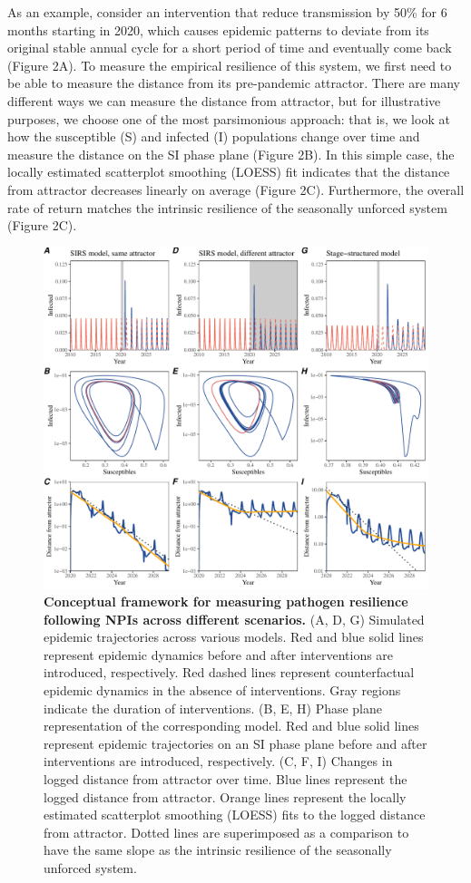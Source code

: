 \documentclass[12pt]{article}
\begin{document}
As an example, consider an intervention that reduce transmission by 50\% for 6 months starting in 2020, which causes epidemic patterns to deviate from its original stable annual cycle for a short period of time and eventually come back (Figure 2A).
To measure the empirical resilience of this system, we first need to be able to measure the distance from its pre-pandemic attractor.
There are many different ways we can measure the distance from attractor, but for illustrative purposes, we choose one of the most parsimonious approach: that is, we look at how the susceptible (S) and infected (I) populations change over time and measure the distance on the SI phase plane (Figure 2B).
In this simple case, the locally estimated scatterplot smoothing (LOESS) fit indicates that the distance from attractor decreases linearly on average (Figure 2C).
Furthermore, the overall rate of return matches the intrinsic resilience of the seasonally unforced system (Figure 2C).

\begin{figure}[!th]
\includegraphics[width=\textwidth]{../figure2/figure2_simple.pdf}
\caption{
\textbf{Conceptual framework for measuring pathogen resilience following NPIs across different scenarios.}
(A, D, G) Simulated epidemic trajectories across various models. 
Red and blue solid lines represent epidemic dynamics before and after interventions are introduced, respectively.
Red dashed lines represent counterfactual epidemic dynamics in the absence of interventions.
Gray regions indicate the duration of interventions.
(B, E, H) Phase plane representation of the corresponding model.
Red and blue solid lines represent epidemic trajectories on an SI phase plane before and after interventions are introduced, respectively.
(C, F, I) Changes in logged distance from attractor over time.
Blue lines represent the logged distance from attractor.
Orange lines represent the locally estimated scatterplot smoothing (LOESS) fits to the logged distance from attractor.
Dotted lines are superimposed as a comparison to have the same slope as the intrinsic resilience of the seasonally unforced system.
}
\end{figure}
\end{document}
